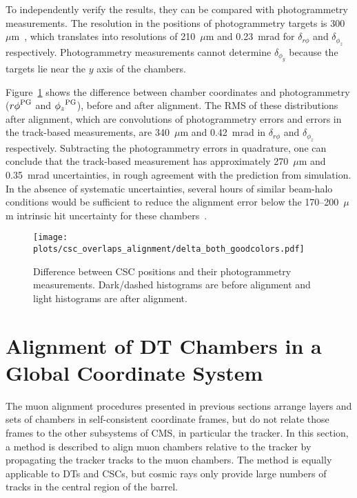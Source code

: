 \documentclass[11pt,twoside,a4paper,cmspaper]{cms-tdr}
\begin{document}
To independently verify the results, they can be compared with
photogrammetry measurements.  The resolution in the positions of
photogrammetry targets is 300~$\mu$m~\cite{ref:endcapPG}, which
translates into resolutions of 210~$\mu$m and 0.23~mrad for
$\delta_{r\phi}$ and $\delta_{\phi_z}$ respectively.  Photogrammetry measurements cannot
determine $\delta_{\phi_y}$ because the targets lie near the $y$ axis
of the chambers.

Figure~\ref{fig:overlaps_data2} shows the difference between chamber
coordinates and photogrammetry (${r\phi}^{\mbox{\scriptsize PG}}$ and
${\phi_z}^{\mbox{\scriptsize PG}}$), before and after alignment.  The
RMS of these distributions after alignment, which are convolutions of 
photogrammetry errors and errors in the track-based measurements, are
340~$\mu$m and 0.42~mrad in $\delta_{r\phi}$ and $\delta_{\phi_z}$ respectively.
Subtracting the photogrammetry errors in quadrature, one can conclude that
the track-based measurement has approximately 270~$\mu$m and 0.35~mrad
uncertainties, in rough agreement with the prediction from simulation.
In the absence of systematic uncertainties, several hours of similar
beam-halo conditions would be sufficient to reduce the alignment error
below the 170--200~$\mu$m intrinsic hit uncertainty for these
chambers~\cite{ref:csc_resolution}.

\begin{figure}
\centering
\texttt{[image: plots/csc\_overlaps\_alignment/delta\_both\_goodcolors.pdf]}
\caption{Difference between CSC positions and their photogrammetry
measurements.  Dark/dashed histograms are before alignment
and light histograms are after alignment.  \label{fig:overlaps_data2}}
\end{figure}

\section{Alignment of DT Chambers in a Global Coordinate System}
\label{sec:global_muon_alignment}

The muon alignment procedures presented in previous sections arrange
layers and sets of chambers in self-consistent coordinate frames, but
do not relate those frames to the other subsystems of CMS, in
particular the tracker.  In this section, a method is described to
align muon chambers relative to the tracker by propagating the tracker
tracks to the muon chambers.  The method is equally applicable to DTs
and CSCs, but cosmic rays only provide large numbers of tracks in the
central region of the barrel.
\end{document}
